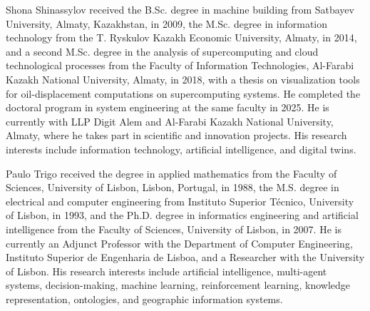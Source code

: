 \begin{IEEEbiographynophoto}{Shona Shinassylov}
received the B.Sc. degree in machine building from Satbayev University, Almaty,
Kazakhstan, in 2009, the M.Sc. degree in information
technology from the T. Ryskulov Kazakh Economic University, Almaty, in 2014,
and a second M.Sc. degree in the analysis of supercomputing and cloud
technological processes from the Faculty of Information Technologies, Al-Farabi
Kazakh National University, Almaty, in 2018, with a thesis on visualization
tools for oil-displacement computations on supercomputing systems. He completed
the doctoral program in system engineering at the same faculty in 2025. He is
currently with LLP Digit Alem and Al-Farabi Kazakh National University, Almaty,
where he takes part in scientific and innovation projects. His research
interests include information technology, artificial intelligence, and digital
twins.
\end{IEEEbiographynophoto}

\begin{IEEEbiographynophoto}{Paulo Trigo}
received the degree in applied mathematics from the Faculty of Sciences,
University of Lisbon, Lisbon, Portugal, in 1988, the M.S. degree in electrical
and computer engineering from Instituto Superior T\'ecnico, University of
Lisbon, in 1993, and the Ph.D. degree in informatics engineering and artificial
intelligence from the Faculty of Sciences, University of Lisbon, in 2007. He is
currently an Adjunct Professor with the Department of Computer Engineering,
Instituto Superior de Engenharia de Lisboa, and a Researcher with the
University of Lisbon. His research interests include artificial intelligence,
multi-agent systems, decision-making, machine learning, reinforcement learning,
knowledge representation, ontologies, and geographic information systems.
\end{IEEEbiographynophoto}
